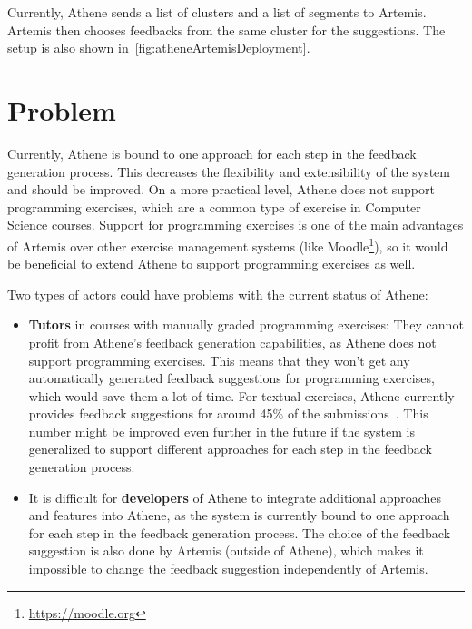 Currently, Athene sends a list of clusters and a list of segments to Artemis. Artemis then chooses feedbacks from the same cluster for the suggestions. The setup is also shown in~\cref{fig:atheneArtemisDeployment}.


\section*{Problem}

Currently, Athene is bound to one approach for each step in the feedback generation process. This decreases the flexibility and extensibility of the system and should be improved.
On a more practical level, Athene does not support programming exercises, which are a common type of exercise in Computer Science courses. Support for programming exercises is one of the main advantages of Artemis over other exercise management systems (like Moodle\footnote{\url{https://moodle.org}}), so it would be beneficial to extend Athene to support programming exercises as well.

Two types of actors could have problems with the current status of Athene:
\begin{itemize}
    \item \textbf{Tutors} in courses with manually graded programming exercises: They cannot profit from Athene's feedback generation capabilities, as Athene does not support programming exercises. This means that they won't get any automatically generated feedback suggestions for programming exercises, which would save them a lot of time.
    For textual exercises, Athene currently provides feedback suggestions for around 45\% of the submissions~\cite{cofee2}. This number might be improved even further in the future if the system is generalized to support different approaches for each step in the feedback generation process.
    \item It is difficult for \textbf{developers} of Athene to integrate additional approaches and features into Athene, as the system is currently bound to one approach for each step in the feedback generation process. The choice of the feedback suggestion is also done by Artemis (outside of Athene), which makes it impossible to change the feedback suggestion independently of Artemis.
\end{itemize}


